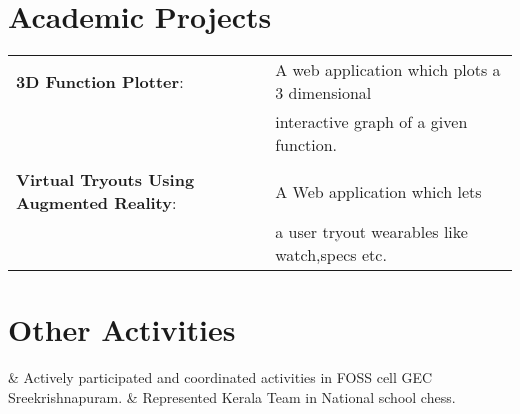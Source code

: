 \documentclass[letterpaper]{article}
\begin{document}
\section*{Academic Projects}
\begin{tabular}{l  l}
 { \bf 3D Function Plotter}: & A web application which plots a 3 dimensional\\
		     & interactive graph of a given function.\\
                     &                                                                                     \\
 {\bf Virtual Tryouts Using Augmented Reality}: & A Web application which lets \\
					 & a user tryout wearables like watch,specs etc. \\

\end{tabular}
\vspace{0.1in}
\hline

\section*{Other Activities}
\begin{easylist}[itemize]
& Actively participated and coordinated activities in FOSS cell GEC Sreekrishnapuram.
& Represented Kerala Team in National school chess.
\end{easylist}
\vspace{0.1in}
\hline

\end{document}
